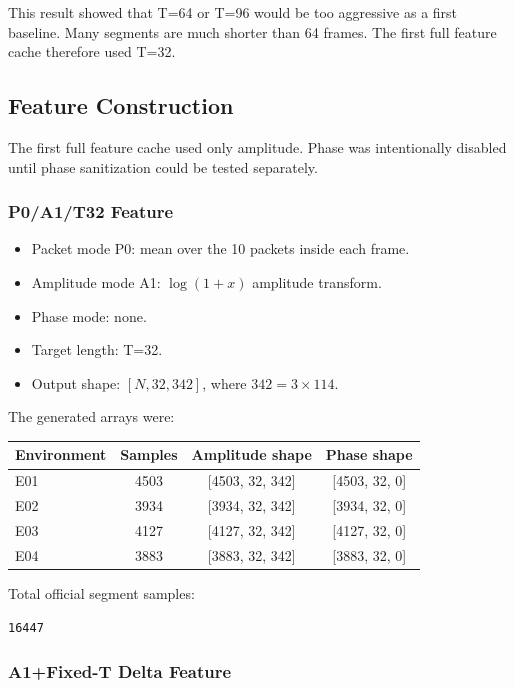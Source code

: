 \documentclass[11pt]{article}
\begin{document}
This result showed that T=64 or T=96 would be too aggressive as a first baseline. Many segments are much shorter than 64 frames. The first full feature cache therefore used T=32.

\subsection{Feature Construction}

The first full feature cache used only amplitude. Phase was intentionally disabled until phase sanitization could be tested separately.

\subsubsection{P0/A1/T32 Feature}

\begin{itemize}
  \item Packet mode P0: mean over the 10 packets inside each frame.
  \item Amplitude mode A1: \(\log(1 + x)\) amplitude transform.
  \item Phase mode: none.
  \item Target length: T=32.
  \item Output shape: \([N,32,342]\), where \(342 = 3 \times 114\).
\end{itemize}

The generated arrays were:

\begin{center}
\begin{tabular}{lccc}
\toprule
Environment & Samples & Amplitude shape & Phase shape \\
\midrule
E01 & 4503 & [4503, 32, 342] & [4503, 32, 0] \\
E02 & 3934 & [3934, 32, 342] & [3934, 32, 0] \\
E03 & 4127 & [4127, 32, 342] & [4127, 32, 0] \\
E04 & 3883 & [3883, 32, 342] & [3883, 32, 0] \\
\bottomrule
\end{tabular}
\end{center}

Total official segment samples:

\begin{verbatim}
16447
\end{verbatim}

\subsubsection{A1+Fixed-T Delta Feature}
\end{document}
